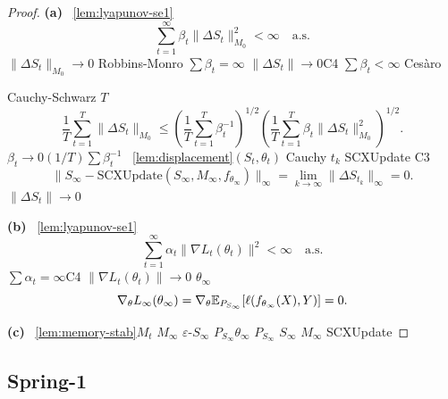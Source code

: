 \begin{proof}
\textbf{(a) } ~\ref{lem:lyapunov-se1} 
\begin{equation}
    \sum_{t=1}^\infty \beta_t \|\Delta S_t\|_{M_0}^2 < \infty \quad \text{a.s.}
\end{equation}
 $\|\Delta S_t\|_{M_0} \to 0$ Robbins-Monro  $\sum \beta_t = \infty$  $\|\Delta S_t\| \to 0$C4  $\sum \beta_t < \infty$  Ces\`{a}ro 

 Cauchy-Schwarz $T$
\begin{equation}
    \frac{1}{T}\sum_{t=1}^{T}\|\Delta S_t\|_{M_0} \leq \left(\frac{1}{T}\sum_{t=1}^{T}\beta_t^{-1}\right)^{1/2} \left(\frac{1}{T}\sum_{t=1}^{T}\beta_t \|\Delta S_t\|_{M_0}^2\right)^{1/2}.
\end{equation}
 $\beta_t \to 0$$(1/T)\sum \beta_t^{-1}$ ~\ref{lem:displacement}$(S_t, \theta_t)$  Cauchy  $t_k$ SCXUpdate C3
\begin{equation}
    \|S_\infty - \text{SCXUpdate}(S_\infty, M_\infty, f_{\theta_\infty})\|_\infty = \lim_{k \to \infty} \|\Delta S_{t_k}\|_\infty = 0.
\end{equation}
 $\|\Delta S_t\| \to 0$ 

\textbf{(b) } ~\ref{lem:lyapunov-se1}
\begin{equation}
    \sum_{t=1}^\infty \alpha_t \|\nabla L_t(\theta_t)\|^2 < \infty \quad \text{a.s.}
\end{equation}
 $\sum \alpha_t = \infty$C4 $\|\nabla L_t(\theta_t)\| \to 0$  $\theta_\infty$
\begin{equation}
    \nabla_\theta L_\infty(\theta_\infty) = \nabla_\theta \mathbb{E}_{P_{S_\infty}}[\ell(f_{\theta_\infty}(X), Y)] = 0.
\end{equation}

\textbf{(c) } ~\ref{lem:memory-stab}$M_t$  $M_\infty$  $\varepsilon$-$S_\infty$  $P_{S_\infty}$$\theta_\infty$  $P_{S_\infty}$  $S_\infty$  $M_\infty$  SCXUpdate 
\end{proof}

\subsection{ Spring-1 }

